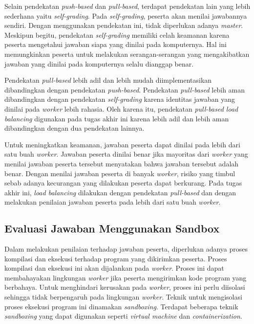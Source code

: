 \par Selain pendekatan \textit{push-based} dan \textit{pull-based}, terdapat pendekatan lain yang lebih sederhana yaitu \textit{self-grading}. Pada \textit{self-grading}, peserta akan menilai jawabannya sendiri. Dengan menggunakan pendekatan ini, tidak diperlukan adanya \textit{master}. Meskipun begitu, pendekatan \textit{self-grading} memiliki celah keamanan karena peserta mengetahui jawaban siapa yang dinilai pada komputernya. Hal ini memungkinkan peserta untuk melakukan serangan-serangan yang mengakibatkan jawaban yang dinilai pada komputernya selalu dianggap benar.

\par Pendekatan \textit{pull-based} lebih adil dan lebih mudah diimplementasikan dibandingkan dengan pendekatan \textit{push-based}. Pendekatan \textit{pull-based} lebih aman dibandingkan dengan pendekatan \textit{self-grading} karena identitas jawaban yang dinilai pada \textit{worker} lebih rahasia. Oleh karena itu, pendekatan \textit{pull-based load balancing} digunakan pada tugas akhir ini karena lebih adil dan lebih aman dibandingkan dengan dua pendekatan lainnya.

\par Untuk meningkatkan keamanan, jawaban peserta dapat dinilai pada lebih dari satu buah \textit{worker}. Jawaban peserta dinilai benar jika mayoritas dari \textit{worker} yang menilai jawaban peserta tersebut menyatakan bahwa jawaban tersebut adalah benar. Dengan menilai jawaban peserta di banyak \textit{worker}, risiko yang timbul sebab adanya kecurangan yang dilakukan peserta dapat berkurang. Pada tugas akhir ini, \textit{load balancing} dilakukan dengan pendekatan \textit{pull-based} dan dengan melakukan penilaian jawaban peserta pada lebih dari satu buah \textit{worker}.

\subsection{Evaluasi Jawaban Menggunakan Sandbox}

\par Dalam melakukan penilaian terhadap jawaban peserta, diperlukan adanya proses kompilasi dan eksekusi terhadap program yang dikirimkan peserta. Proses kompilasi dan eksekusi ini akan dijalankan pada \textit{worker}. Proses ini dapat membahayakan lingkungan \textit{worker} jika peserta mengirimkan kode program yang berbahaya. Untuk menghindari kerusakan pada \textit{worker}, proses ini perlu diisolasi sehingga tidak berpengaruh pada lingkungan \textit{worker}. Teknik untuk mengisolasi proses eksekusi program ini dinamakan \textit{sandboxing}. Terdapat beberapa teknik \textit{sandboxing} yang dapat digunakan seperti \textit{virtual machine} dan \textit{containerization}.

